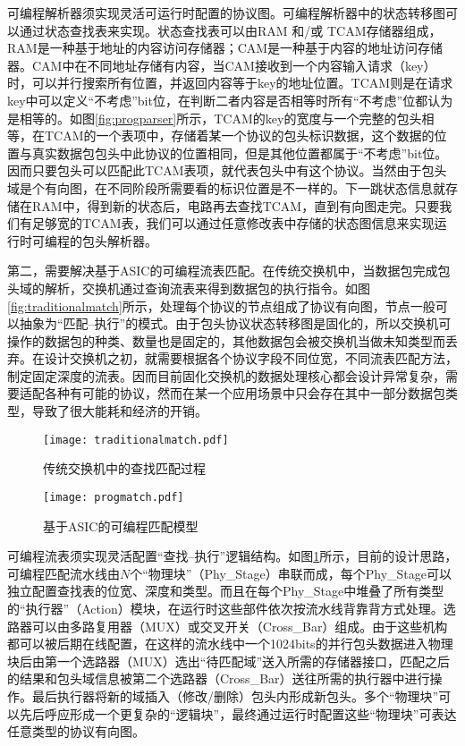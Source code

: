 可编程解析器须实现灵活可运行时配置的协议图。可编程解析器中的状态转移图可以通过状态查找表来实现。状态查找表可以由RAM 和/或 TCAM存储器组成，RAM是一种基于地址的内容访问存储器；CAM是一种基于内容的地址访问存储器。CAM中在不同地址存储有内容，当CAM接收到一个内容输入请求（key）时，可以并行搜索所有位置，并返回内容等于key的地址位置。TCAM则是在请求key中可以定义“不考虑”bit位，在判断二者内容是否相等时所有“不考虑”位都认为是相等的。如图\ref{fig:progparser}所示，TCAM的key的宽度与一个完整的包头相等，在TCAM的一个表项中，存储着某一个协议的包头标识数据，这个数据的位置与真实数据包包头中此协议的位置相同，但是其他位置都属于“不考虑”bit位。因而只要包头可以匹配此TCAM表项，就代表包头中有这个协议。当然由于包头域是个有向图，在不同阶段所需要看的标识位置是不一样的。下一跳状态信息就存储在RAM中，得到新的状态后，电路再去查找TCAM，直到有向图走完。只要我们有足够宽的TCAM表，我们可以通过任意修改表中存储的状态图信息来实现运行时可编程的包头解析器。

第二，需要解决基于ASIC的可编程流表匹配。在传统交换机中，当数据包完成包头域的解析，交换机通过查询流表来得到数据包的执行指令。如图\ref{fig:traditionalmatch}所示，处理每个协议的节点组成了协议有向图，节点一般可以抽象为“匹配--执行”的模式。由于包头协议状态转移图是固化的，所以交换机可操作的数据包的种类、数量也是固定的，其他数据包会被交换机当做未知类型而丢弃。在设计交换机之初，就需要根据各个协议字段不同位宽，不同流表匹配方法，制定固定深度的流表。因而目前固化交换机的数据处理核心都会设计异常复杂，需要适配各种有可能的协议，然而在某一个应用场景中只会存在其中一部分数据包类型，导致了很大能耗和经济的开销。



\begin{figure}[htbp]
	\centering
	\begin{minipage}[t]{0.48\textwidth}
		\centering
		\texttt{[image: traditionalmatch.pdf]}
		\caption{传统交换机中的查找匹配过程} \label{fig:traditionalmatch}
	\end{minipage}
	\begin{minipage}[t]{0.48\textwidth}
		\centering
		\texttt{[image: progmatch.pdf]}%
		\caption{基于ASIC的可编程匹配模型} \label{fig:progmatch}
	\end{minipage}
\end{figure}

可编程流表须实现灵活配置“查找--执行”逻辑结构。如图\ref{fig:progmatch}所示，目前的设计思路，可编程匹配流水线由$N$个“物理块”（Phy\_Stage）串联而成，每个Phy\_Stage可以独立配置查找表的位宽、深度和类型。而且在每个Phy\_Stage中堆叠了所有类型的“执行器”（Action）模块，在运行时这些部件依次按流水线背靠背方式处理。选路器可以由多路复用器（MUX）或交叉开关（Cross\_Bar）组成。由于这些机构都可以被后期在线配置，在这样的流水线中一个1024bits的并行包头数据进入物理块后由第一个选路器（MUX）选出“待匹配域”送入所需的存储器接口，匹配之后的结果和包头域信息被第二个选路器（Cross\_Bar）送往所需的执行器中进行操作。最后执行器将新的域插入（修改/删除）包头内形成新包头。多个“物理块”可以先后呼应形成一个更复杂的“逻辑块”，最终通过运行时配置这些“物理块”可表达任意类型的协议有向图。


